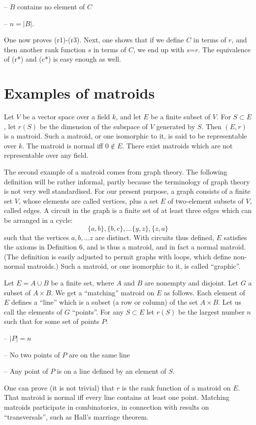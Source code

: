 \documentclass[12pt]{article}
\begin{document}
-- $B$ contains no element of $C$

-- $n=|B|$.

One now proves (r1)-(r3).
Next, one shows that if we define $C$ in terms of
$r$, and then another rank function $s$ in terms of $C$, we end up with
$s$=$r$.
The equivalence of (r*) and (c*) is easy enough as well.

\section{Examples of matroids}
Let $V$ be a vector space over a field $k$, and let $E$ be a finite subset of
$V$.
For $S\subset E$, let $r(S)$ be the dimension of the subspace of $V$
generated by $S$.
Then $(E,r)$ is a matroid.
Such a matroid, or one isomorphic
to it, is said to be representable over $k$.
The matroid is normal iff $0\notin E$.
There exist matroids which are not representable over any field.

The second example of a matroid comes from graph theory.
The following definition will be rather informal, partly because the
terminology of graph theory is not very well standardised.
For our present purpose, a graph consists
of a finite set $V$, whose elements are called vertices, plus a set $E$ of
two-element subsets of $V$, called edges.
A circuit in the graph is a finite set of at least three edges which can
be arranged in a cycle:
$$\{a,b\},\{b,c\},\ldots \{y,z\},\{z,a\}$$
such that the vertices $a,b,\ldots z$ are distinct.
With circuits thus defined, $E$ satisfies the axioms in Definition 6,
and is thus a matroid, and in fact a normal matroid.
(The definition is easily adjusted to permit graphs with loops, which
define non-normal matroids.)
Such a matroid, or one isomorphic to it, is called ``graphic''.

Let $E=A\cup B$ be a finite set, where $A$ and $B$ are nonempty and disjoint.
Let $G$ a subset of $A\times B$.
We get a ``matching'' matroid on $E$ as follows.
Each element of $E$ defines a ``line'' which is a subset
(a row or column) of the set $A\times B$.
Let us call the elements of $G$ ``points''.
For any $S\subset E$ let $r(S)$
be the largest number $n$ such that for some set of points $P$:

-- $|P| = n$

-- No two points of $P$ are on the same line

-- Any point of $P$ is on a line defined by an element of $S$.

One can prove (it is not trivial) that $r$ is the rank function of
a matroid on $E$.
That matroid is normal iff every line contains at least one point.
Matching matroids participate in combinatorics, in
connection with results on ``transversals'', such as Hall's marriage
theorem.
\end{document}
